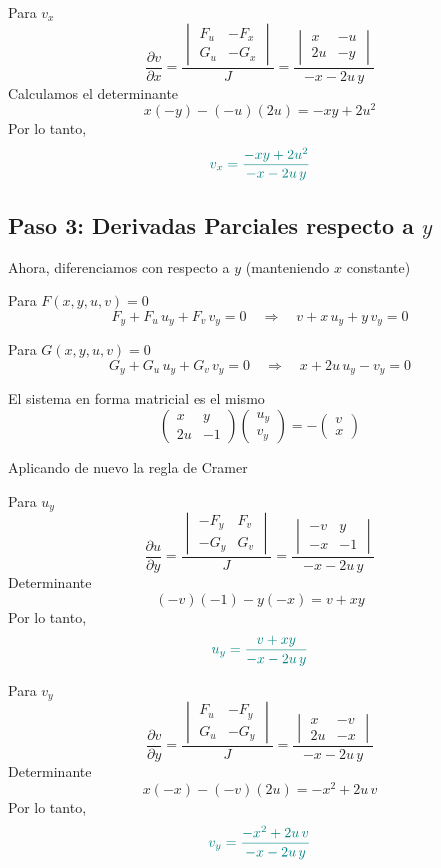 \documentclass{article}
\begin{document}
Para \( \displaystyle v_x\)
\[
\frac{\partial v}{\partial x} =
\frac{
\begin{vmatrix}
F_u & - F_x \\
G_u & - G_x
\end{vmatrix}
}{J}
=\frac{
\begin{vmatrix}
x & - u \\
2u & - y
\end{vmatrix}
}{-x - 2u\,y}
\]
Calculamos el determinante
\[
x(-y) - (-u)(2u) = -xy + 2u^2
\]
Por lo tanto,
\[\color{teal}
v_x = \frac{-xy + 2u^2}{-x - 2u\,y}
\]

\subsection*{Paso 3: Derivadas Parciales respecto a \(y\)}

Ahora, diferenciamos con respecto a \(y\) (manteniendo \(x\) constante)

Para \(F(x,y,u,v)=0\)
\[
F_y + F_u\,u_y + F_v\,v_y = 0 \quad \Longrightarrow \quad v + x\,u_y + y\,v_y = 0
\]

Para \(G(x,y,u,v)=0\)
\[
G_y + G_u\,u_y + G_v\,v_y = 0 \quad \Longrightarrow \quad x + 2u\,u_y - v_y = 0
\]

El sistema en forma matricial es el mismo
\[
\begin{pmatrix}
x & y \\
2u & -1
\end{pmatrix}
\begin{pmatrix}
u_y \\[3mm] v_y
\end{pmatrix}
=
-\begin{pmatrix}
v \\[3mm] x
\end{pmatrix}
\]

Aplicando de nuevo la regla de Cramer

Para \( \displaystyle u_y\)
\[
\frac{\partial u}{\partial y} =
\frac{
\begin{vmatrix}
- F_y & F_v \\
- G_y & G_v
\end{vmatrix}
}{J}
=\frac{
\begin{vmatrix}
- v & y \\
- x & -1
\end{vmatrix}
}{-x - 2u\,y}
\]
Determinante
\[
(-v)(-1) - y(-x) = v + xy
\]
Por lo tanto,
\[\color{teal}
u_y = \frac{v + xy}{-x - 2u\,y}
\]

Para \( \displaystyle v_y\)
\[
\frac{\partial v}{\partial y} =
\frac{
\begin{vmatrix}
F_u & - F_y \\
G_u & - G_y
\end{vmatrix}
}{J}
=\frac{
\begin{vmatrix}
x & - v \\
2u & - x
\end{vmatrix}
}{-x - 2u\,y}
\]
Determinante
\[
x(-x) - (-v)(2u) = -x^2 + 2u\,v
\]
Por lo tanto,
\[\color{teal}
v_y = \frac{-x^2 + 2u\,v}{-x - 2u\,y}
\]
\end{document}
